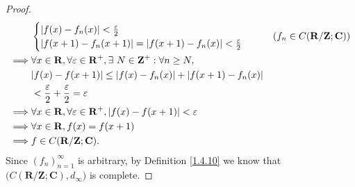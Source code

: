 \begin{proof}
\begin{align*}
                 & \begin{cases}
                       \abs*{f(x) - f_n(x)} < \frac{\varepsilon}{2} \\
                       \abs*{f(x + 1) - f_n(x + 1)} = \abs*{f(x + 1) - f_n(x)} < \frac{\varepsilon}{2}
                   \end{cases}                                 & (f_n \in C(\mathbf{R} / \mathbf{Z} ; \mathbf{C}))                 \\
        \implies & \forall x \in \mathbf{R}, \forall \varepsilon \in \mathbf{R}^+, \exists\ N \in \mathbf{Z}^+ : \forall n \geq N, \\
                 & \abs*{f(x) - f(x + 1)} \leq \abs*{f(x) - f_n(x)} + \abs*{f(x + 1) - f_n(x)}                                     \\
                 & < \frac{\varepsilon}{2} + \frac{\varepsilon}{2} = \varepsilon                                                   \\
        \implies & \forall x \in \mathbf{R}, \forall \varepsilon \in \mathbf{R}^+, \abs*{f(x) - f(x + 1)} < \varepsilon            \\
        \implies & \forall x \in \mathbf{R}, f(x) = f(x + 1)                                                                       \\
        \implies & f \in C(\mathbf{R} / \mathbf{Z} ; \mathbf{C}).
    \end{align*}
    Since \((f_n)_{n = 1}^\infty\) is arbitrary, by Definition \ref{1.4.10} we know that \(\big(C(\mathbf{R} / \mathbf{Z} ; \mathbf{C}), d_\infty\big)\) is complete.
\end{proof}